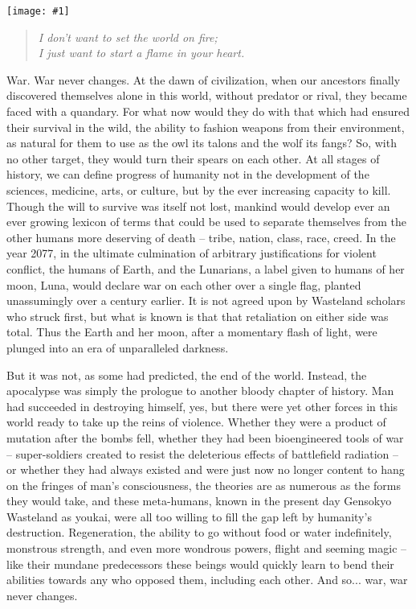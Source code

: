\documentclass[a4paper,12pt]{book}
\newcommand{\img}[1]{%
	\texttt{[image: \#1]}%
}
\begin{document}
\img{reiuji-strangelove}

\begin{quote}
\emph{I don't want to set the world on fire;\\
I just want to start a flame in your heart.}
\end{quote}


War. War never changes. At the dawn of civilization, when our ancestors finally discovered themselves alone in this world, without predator or rival, they became faced with a quandary. For what now would they do with that which had ensured their survival in the wild, the ability to fashion weapons from their environment, as natural for them to use as the owl its talons and the wolf its fangs? So, with no other target, they would turn their spears on each other. At all stages of history, we can define progress of humanity not in the development of the sciences, medicine, arts, or culture, but by the ever increasing capacity to kill. Though the will to survive was itself not lost, mankind would develop ever an ever growing lexicon of terms that could be used to separate themselves from the other humans more deserving of death -- tribe, nation, class, race, creed. In the year 2077, in the ultimate culmination of arbitrary justifications for violent conflict, the humans of Earth, and the Lunarians, a label given to humans of her moon, Luna, would declare war on each other over a single flag, planted unassumingly over a century earlier. It is not agreed upon by Wasteland scholars who struck first, but what is known is that that retaliation on either side was total. Thus the Earth and her moon, after a momentary flash of light, were plunged into an era of unparalleled darkness.

But it was not, as some had predicted, the end of the world. Instead, the apocalypse was simply the prologue to another bloody chapter of history. Man had succeeded in destroying himself, yes, but there were yet other forces in this world ready to take up the reins of violence. Whether they were a product of mutation after the bombs fell, whether they had been bioengineered tools of war -- super-soldiers created to resist the deleterious effects of battlefield radiation -- or whether they had always existed and were just now no longer content to hang on the fringes of man's consciousness, the theories are as numerous as the forms they would take, and these meta-humans, known in the present day Gensokyo Wasteland as youkai, were all too willing to fill the gap left by humanity's destruction. Regeneration, the ability to go without food or water indefinitely, monstrous strength, and even more wondrous powers, flight and seeming magic -- like their mundane predecessors these beings would quickly learn to bend their abilities towards any who opposed them, including each other. And so... war, war never changes.
\end{document}
